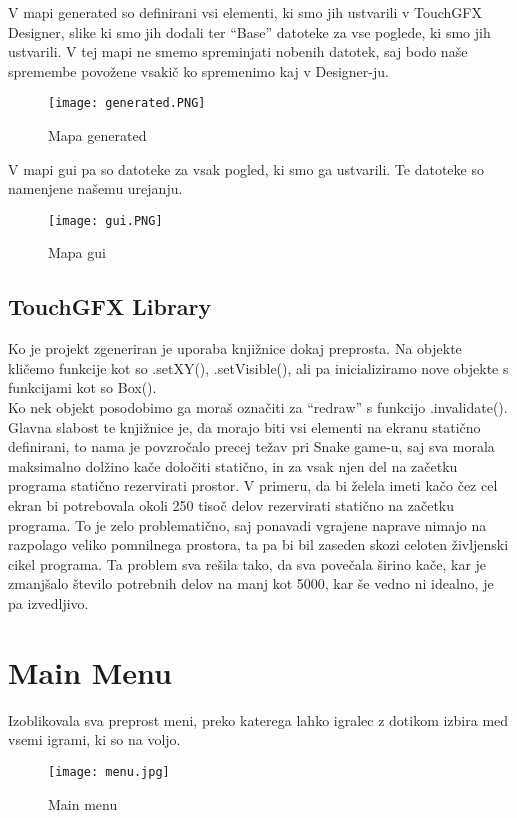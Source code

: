 \documentclass{article}
\begin{document}
\noindent
V mapi generated so definirani vsi elementi, ki smo jih ustvarili
v TouchGFX Designer, slike ki smo jih dodali ter ``Base'' datoteke
za vse poglede, ki smo jih ustvarili. V tej mapi ne smemo spreminjati
nobenih datotek, saj bodo na\v{s}e spremembe povo\v{z}ene vsaki\v{c}
ko spremenimo kaj v Designer-ju. \\
\begin{figure}[H] %
  \centering
  \texttt{[image: generated.PNG]}
  \caption{Mapa generated}
\end{figure}

\noindent
V mapi gui pa so datoteke za vsak pogled, ki smo ga ustvarili. Te
datoteke so namenjene na\v{s}emu urejanju.
\begin{figure}[H] %
  \centering
  \texttt{[image: gui.PNG]}
  \caption{Mapa gui}
\end{figure}

\subsection{TouchGFX Library}
\noindent
Ko je projekt zgeneriran je uporaba knji\v{z}nice dokaj
preprosta. Na objekte kli\v{c}emo funkcije kot so .setXY(),
.setVisible(), ali pa inicializiramo nove objekte s funkcijami kot
so Box(). \\
Ko nek objekt posodobimo ga mora\v{s} ozna\v{c}iti za ``redraw'' s
funkcijo .invalidate(). \\
Glavna slabost te knji\v{z}nice je, da morajo biti vsi elementi na
ekranu stati\v{c}no definirani, to nama je povzro\v{c}alo precej te\v{z}av
pri Snake game-u, saj sva morala maksimalno dol\v{z}ino ka\v{c}e
dolo\v{c}iti stati\v{c}no, in za vsak njen del na za\v{c}etku programa
stati\v{c}no rezervirati prostor. V primeru, da bi
\v{z}elela imeti ka\v{c}o \v{c}ez cel ekran bi potrebovala okoli 250
tiso\v{c} delov rezervirati stati\v{c}no na za\v{c}etku programa. To je
zelo problemati\v{c}no, saj ponavadi vgrajene naprave nimajo na razpolago
veliko pomnilnega prostora, ta pa bi bil zaseden skozi celoten \v{z}ivljenski
cikel programa. Ta problem sva re\v{s}ila tako, da sva pove\v{c}ala \v{s}irino
ka\v{c}e, kar je zmanj\v{s}alo \v{s}tevilo potrebnih delov na
manj kot 5000, kar \v{s}e vedno ni idealno, je pa izvedljivo.


\section{Main Menu}
\noindent
Izoblikovala sva preprost meni, preko katerega lahko igralec z dotikom
izbira med vsemi igrami, ki so na voljo. \\
\begin{figure}[H] %
  \centering
  \texttt{[image: menu.jpg]}
  \caption{Main menu}
\end{figure}
\end{document}
